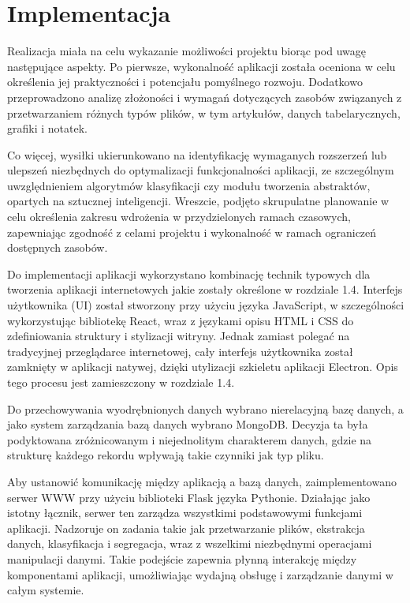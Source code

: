 \documentclass[12pt,a4paper,twoside]{article}
\begin{document}
\section{Implementacja}
Realizacja miała na celu wykazanie możliwości projektu biorąc pod uwagę następujące aspekty. 
Po pierwsze, wykonalność aplikacji została oceniona w celu określenia jej praktyczności i potencjału pomyślnego rozwoju.
Dodatkowo przeprowadzono analizę złożoności i wymagań dotyczących zasobów związanych z przetwarzaniem różnych typów plików, w tym artykułów, danych tabelarycznych, grafiki i notatek.\par
Co więcej, wysiłki ukierunkowano na identyfikację wymaganych rozszerzeń lub ulepszeń niezbędnych do optymalizacji funkcjonalności aplikacji, ze szczególnym uwzględnieniem algorytmów klasyfikacji czy modułu tworzenia abstraktów, opartych na sztucznej inteligencji.
Wreszcie, podjęto skrupulatne planowanie w celu określenia zakresu wdrożenia w przydzielonych ramach czasowych, zapewniając zgodność z celami projektu i wykonalność w ramach ograniczeń dostępnych zasobów.\par
Do implementacji aplikacji wykorzystano kombinację technik typowych dla tworzenia aplikacji internetowych jakie zostały określone w rozdziale 1.4. Interfejs użytkownika (UI) został stworzony przy użyciu języka JavaScript, w szczególności wykorzystując bibliotekę React, wraz z językami opisu HTML i CSS do zdefiniowania struktury i stylizacji witryny. Jednak zamiast polegać na tradycyjnej przeglądarce internetowej, cały interfejs użytkownika został zamknięty w aplikacji natywej, dzięki utylizacji szkieletu aplikacji Electron. Opis tego procesu jest zamieszczony w rozdziale 1.4.\par
Do przechowywania wyodrębnionych danych wybrano nierelacyjną bazę danych, a jako system zarządzania bazą danych wybrano MongoDB. Decyzja ta była podyktowana zróżnicowanym i niejednolitym charakterem danych, gdzie na strukturę każdego rekordu wpływają takie czynniki jak typ pliku.\par
Aby ustanowić komunikację między aplikacją a bazą danych, zaimplementowano serwer WWW przy użyciu biblioteki Flask języka Pythonie. Działając jako istotny łącznik, serwer ten zarządza wszystkimi podstawowymi funkcjami aplikacji. Nadzoruje on zadania takie jak przetwarzanie plików, ekstrakcja danych, klasyfikacja i segregacja, wraz z wszelkimi niezbędnymi operacjami manipulacji danymi. Takie podejście zapewnia płynną interakcję między komponentami aplikacji, umożliwiając wydajną obsługę i zarządzanie danymi w całym systemie.\par
\end{document}
